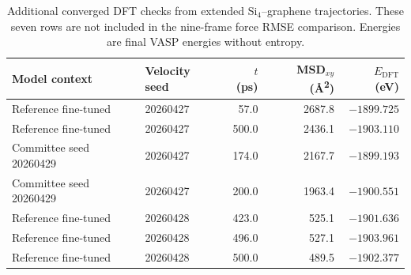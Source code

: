 \begin{table}[!htbp]
  \centering
  \footnotesize
  \caption{Additional converged DFT checks from extended Si$_4$--graphene
  trajectories. These seven rows are not included in the nine-frame force RMSE
  comparison. Energies are final VASP energies without entropy.}
  \label{tab:si_extended_snapshots}
  \begin{tabular}{llrrr}
    \toprule
    Model context & Velocity seed & $t$ (ps) & MSD$_{xy}$ (\si{\angstrom\squared}) & $E_{\mathrm{DFT}}$ (eV) \\
    \midrule
    Reference fine-tuned & 20260427 & 57.0 & 2687.8 & $-1899.725$ \\
    Reference fine-tuned & 20260427 & 500.0 & 2436.1 & $-1903.110$ \\
    Committee seed 20260429 & 20260427 & 174.0 & 2167.7 & $-1899.193$ \\
    Committee seed 20260429 & 20260427 & 200.0 & 1963.4 & $-1900.551$ \\
    Reference fine-tuned & 20260428 & 423.0 & 525.1 & $-1901.636$ \\
    Reference fine-tuned & 20260428 & 496.0 & 527.1 & $-1903.961$ \\
    Reference fine-tuned & 20260428 & 500.0 & 489.5 & $-1902.377$ \\
    \bottomrule
  \end{tabular}
\end{table}
